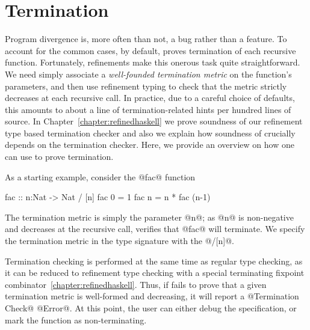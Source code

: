 \section{Termination}\label{sec:termination}

Program divergence is, more often than not,
a bug rather than a feature. 
%
To account for the common cases, 
by default, \toolname proves termination of each recursive function.
%
Fortunately, refinements make this onerous task quite straightforward. 
We need simply associate a \emph{well-founded termination metric} %
on the function's parameters, and then use refinement typing to check 
that the metric strictly decreases at each recursive call. In practice,
due to a careful choice of defaults, this amounts to about a line 
of termination-related hints per hundred lines of source. 
%
In Chapter~\ref{chapter:refinedhaskell}
we prove soundness of our refinement type based termination checker 
and also we explain how soundness of \toolname crucially depends on 
the termination checker. 
%
Here, we provide an overview on how one can use \toolname 
to prove termination.

As a starting example, consider the @fac@ function
%
\begin{code}
  fac :: n:Nat -> Nat / [n]
  fac 0 = 1 
  fac n = n * fac (n-1)
\end{code}
%
The termination metric is simply the parameter @n@; 
as @n@ is non-negative and decreases at the recursive 
call, \toolname verifies that @fac@ will terminate.
%
We specify the termination metric in the type signature 
with the @/[n]@.

Termination checking is performed at the same 
time as regular type checking, as it can be 
reduced to refinement type checking with a 
special terminating fixpoint combinator~\ref{chapter:refinedhaskell}.
Thus, if \toolname fails to prove that a given 
termination metric is well-formed and decreasing, 
it will report a @Termination Check@ @Error@. 
At this point, the user can either debug 
the specification, or mark the function 
as non-terminating.


